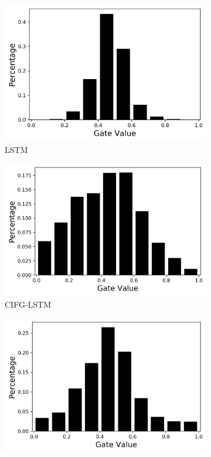 \documentclass[letterpaper]{article} %
\begin{document}
\begin{figure}[h]
	\centering
	\begin{subfigure}{.48\columnwidth}
		\centering
		\includegraphics[width=\linewidth]{sample_cr_tr_input_LSTM.png}
		\caption{LSTM}
	\end{subfigure}\hfil
	\begin{subfigure}{.48\columnwidth}
		\centering
		\includegraphics[width=\linewidth]{sample_cr_tr_input_CIFGLSTM.png}
		\caption{CIFG-LSTM} 
	\end{subfigure}\hfil
	\begin{subfigure}{.48\columnwidth}
		\centering
		\includegraphics[width=\linewidth]{sample_cr_tr_input_G2LSTM.png}

\end{subfigure}
\end{figure}
\end{document}
